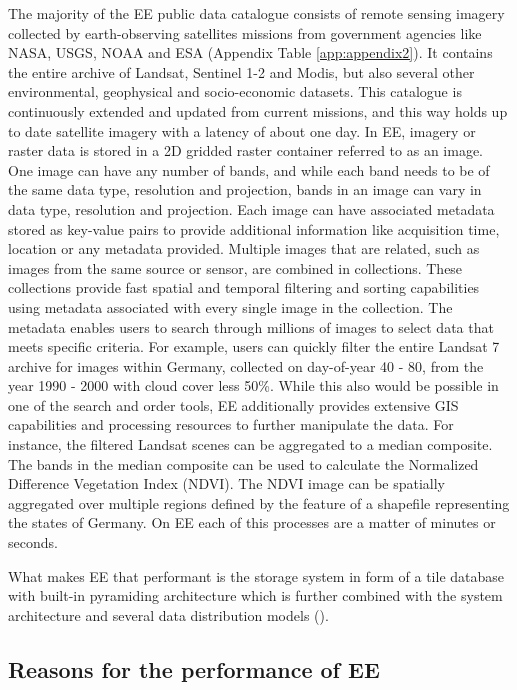 The majority of the EE public data catalogue consists of remote sensing imagery collected by earth-observing satellites missions from government agencies like NASA, USGS, NOAA and ESA (Appendix Table \ref{app:appendix2}). It contains the entire archive of Landsat, Sentinel 1-2 and Modis, but also several other environmental, geophysical and socio-economic datasets. This catalogue is continuously extended and updated from current missions, and this way holds up to date satellite imagery with a latency of about one day.
In EE, imagery or raster data is stored in a 2D gridded raster container referred to as an image. One image can have any number of bands, and while each band needs to be of the same data type, resolution and projection, bands in an image can vary in data type, resolution and projection. Each image can have associated metadata stored as key-value pairs to provide additional information like acquisition time, location or any metadata provided.
Multiple images that are related, such as images from the same source or sensor, are combined in collections. These collections provide fast spatial and temporal filtering and sorting capabilities using metadata associated with every single image in the collection. The metadata enables users to search through millions of images to select data that meets specific criteria. For example, users can quickly filter the entire Landsat 7 archive for images within Germany, collected on day-of-year 40 - 80, from the year 1990 - 2000 with cloud cover less 50\%. While this also would be possible in one of the search and order tools, EE additionally provides extensive GIS capabilities and processing resources to further manipulate the data.
For instance, the filtered Landsat scenes can be aggregated to a median composite. The bands in the median composite can be used to calculate the Normalized Difference Vegetation Index (NDVI). The NDVI image can be spatially aggregated over multiple regions defined by the feature of a shapefile representing the states of Germany. On EE each of this processes are a matter of minutes or seconds.

What makes EE that performant is the storage system in form of a tile database with built-in pyramiding architecture which is further combined with the system architecture and several data distribution models (\cite{gorelick2017google}).

\subsection{Reasons for the performance of EE}


